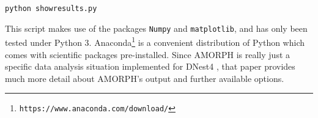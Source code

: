 \documentclass[review]{elsarticle}
\begin{document}
\vspace{1em}
{\tt python showresults.py}
\vspace{1em}

This script makes use of the packages {\tt Numpy} and {\tt matplotlib},
and has only been tested under Python 3. Anaconda\footnote{\tt https://www.anaconda.com/download/} is a convenient distribution
of Python which comes with scientific packages pre-installed.
Since AMORPH is really just a specific data analysis situation implemented
for DNest4 \citep{dnest4}, that paper provides much more detail about
AMORPH's output and further available options.
\end{document}
